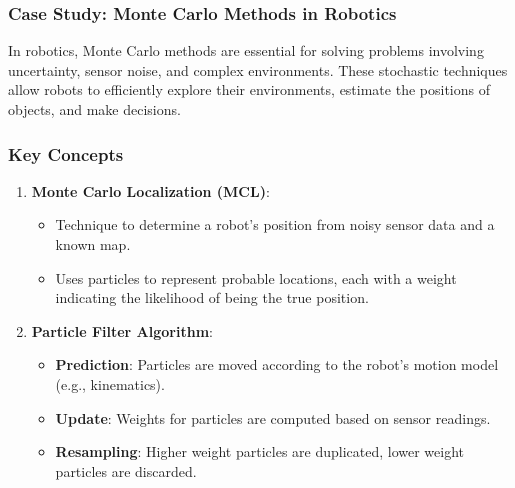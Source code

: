 \documentclass[aspectratio=169]{beamer}
\begin{document}
\begin{frame}[fragile]
    \frametitle{Case Study: Monte Carlo Methods in Robotics}
    In robotics, Monte Carlo methods are essential for solving problems involving uncertainty, sensor noise, and complex environments. These stochastic techniques allow robots to efficiently explore their environments, estimate the positions of objects, and make decisions.
\end{frame}

\begin{frame}[fragile]
    \frametitle{Key Concepts}
    \begin{enumerate}
        \item \textbf{Monte Carlo Localization (MCL)}:
        \begin{itemize}
            \item Technique to determine a robot's position from noisy sensor data and a known map.
            \item Uses particles to represent probable locations, each with a weight indicating the likelihood of being the true position.
        \end{itemize}
        
        \item \textbf{Particle Filter Algorithm}:
        \begin{itemize}
            \item \textbf{Prediction}: Particles are moved according to the robot’s motion model (e.g., kinematics).
            \item \textbf{Update}: Weights for particles are computed based on sensor readings.
            \item \textbf{Resampling}: Higher weight particles are duplicated, lower weight particles are discarded.
        \end{itemize}
    \end{enumerate}
\end{frame}
\end{document}
